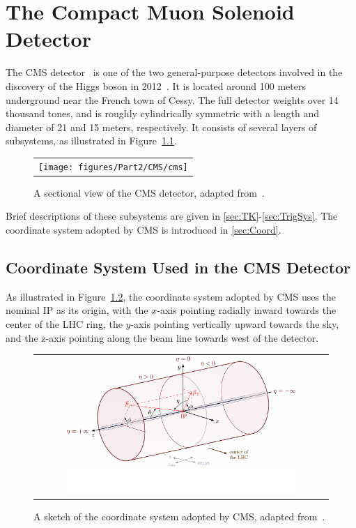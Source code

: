\chapter{The Compact Muon Solenoid Detector}
\label{chap:CMS}

The \ac{CMS} detector~\cite{CMS:2008xjf} is one of the two general-purpose detectors involved in the discovery of the Higgs boson in 2012~\cite{ATLAS:2012yve,CMS:2012qbp}. It is located around 100 meters underground near the French town of Cessy. The full detector weights over 14 thousand tones, and is roughly cylindrically symmetric with a length and diameter of 21 and 15 meters, respectively. It consists of several layers of subsystems, as illustrated in Figure~\ref{fig:CMS}.

\begin{figure}[tbh!]
 \begin{center}
 \begin{tabular}{c}
 \texttt{[image: figures/Part2/CMS/cms]}
 \end{tabular}
 \caption{A sectional view of the \ac{CMS} detector, adapted from~\cite{Sakuma:2013jqa}.}
 \label{fig:CMS}
 \end{center}
\end{figure}

Brief descriptions of these subsystems are given in \autoref{sec:TK}-\autoref{sec:TrigSys}. The coordinate system adopted by \ac{CMS} is introduced in \autoref{sec:Coord}.

\section{Coordinate System Used in the CMS Detector}
\label{sec:Coord}

As illustrated in Figure~\ref{fig:axis3D}, the coordinate system adopted by \ac{CMS} uses the nominal \ac{IP} as its origin, with the $x$-axis pointing radially inward towards the center of the \ac{LHC} ring, the $y$-axis pointing vertically upward towards the sky, and the z-axis pointing along the beam line towards west of the detector.

\begin{figure}[tbh!]
 \begin{center}
 \begin{tabular}{c}
 \includegraphics[width=0.8\textwidth]{figures/Part2/CMS/axis3D_CMS-004}
 \end{tabular}
 \caption{A sketch of the coordinate system adopted by \ac{CMS}, adapted from~\cite{tikz:3D}.}
 \label{fig:axis3D}
 \end{center}
\end{figure}

